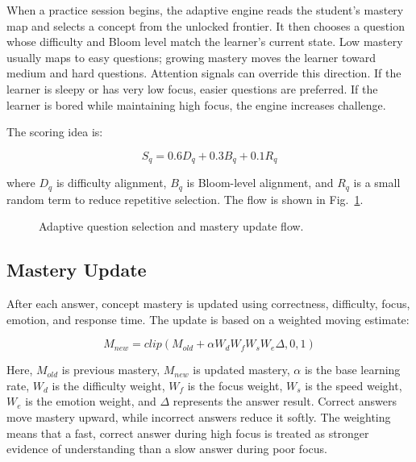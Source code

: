 \documentclass[conference]{IEEEtran}
\begin{document}
When a practice session begins, the adaptive engine reads the student's mastery map and selects a concept from the unlocked frontier. It then chooses a question whose difficulty and Bloom level match the learner's current state. Low mastery usually maps to easy questions; growing mastery moves the learner toward medium and hard questions. Attention signals can override this direction. If the learner is sleepy or has very low focus, easier questions are preferred. If the learner is bored while maintaining high focus, the engine increases challenge.

The scoring idea is:

\begin{equation}
S_q = 0.6D_q + 0.3B_q + 0.1R_q
\end{equation}

where \(D_q\) is difficulty alignment, \(B_q\) is Bloom-level alignment, and \(R_q\) is a small random term to reduce repetitive selection. The flow is shown in Fig.~\ref{fig:adaptive}.

\begin{figure}[!htbp]
  \centering
  \resizebox{\columnwidth}{!}{}
  \caption{Adaptive question selection and mastery update flow.}
  \label{fig:adaptive}
\end{figure}

\FloatBarrier

\subsection{Mastery Update}

After each answer, concept mastery is updated using correctness, difficulty, focus, emotion, and response time. The update is based on a weighted moving estimate:

\begin{equation}
M_{new} = clip(M_{old} + \alpha W_d W_f W_s W_e \Delta, 0, 1)
\end{equation}

Here, \(M_{old}\) is previous mastery, \(M_{new}\) is updated mastery, \(\alpha\) is the base learning rate, \(W_d\) is the difficulty weight, \(W_f\) is the focus weight, \(W_s\) is the speed weight, \(W_e\) is the emotion weight, and \(\Delta\) represents the answer result. Correct answers move mastery upward, while incorrect answers reduce it softly. The weighting means that a fast, correct answer during high focus is treated as stronger evidence of understanding than a slow answer during poor focus.
\end{document}
